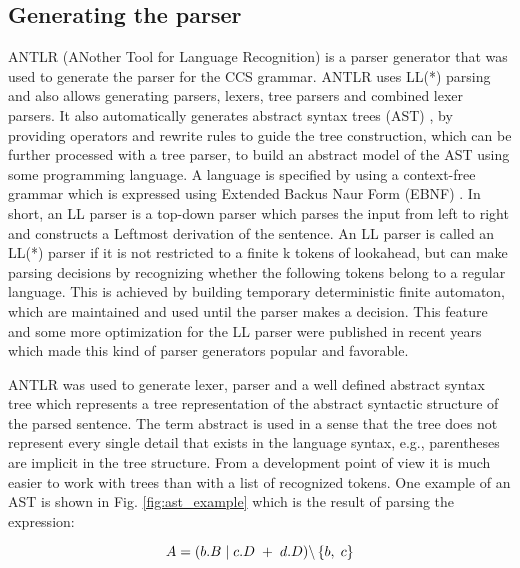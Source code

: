 \subsection{Generating the parser}
ANTLR (ANother Tool for Language Recognition) \cite{ANTLR} is a parser generator that was used 
to generate the parser for the CCS grammar. ANTLR uses LL(*) parsing and also allows generating 
parsers, lexers, tree parsers and combined lexer parsers. It also automatically generates 
abstract syntax trees (AST) \cite{Compilers}, by providing operators and rewrite rules to guide the tree construction,
which can be further processed with a tree parser, to build an abstract model of the AST using some programming language.
A language is specified by using a context-free grammar which is expressed using Extended Backus Naur Form (EBNF) \cite{Compilers}. 
In short, an LL parser is a 
top-down parser which parses the input from left to right and constructs a Leftmost derivation 
of the sentence. An LL parser is called an LL(*) parser if it is not restricted to a finite k 
tokens of lookahead, but can make parsing decisions by recognizing whether the following tokens
belong to a regular language. This is achieved by building temporary deterministic finite
automaton, which are maintained and used until the parser makes a decision. This feature and
some more optimization for the LL parser were published in recent years which made this kind 
of parser generators popular and favorable.

ANTLR was used to generate lexer, parser and a well defined abstract syntax tree which represents a tree representation 
of the abstract syntactic structure of the parsed sentence. The term abstract is used in a sense 
that the tree does not represent every single detail that exists in the language syntax, 
e.g., parentheses are implicit in the tree structure. From a development point of view it is 
much easier to work with trees than with a list of recognized tokens. One example of an AST 
is shown in  Fig. \ref{fig:ast_example} which is the result of parsing the expression: 

\begin{equation}\label{eq:ccs_example}
 A=( b.B \hspace{1 mm} | \hspace{1 mm} c.D \hspace{1 mm} + \hspace{1 mm} d.D )
\backslash \left\lbrace b, \hspace{1 mm} c \right\rbrace 
\end{equation}

